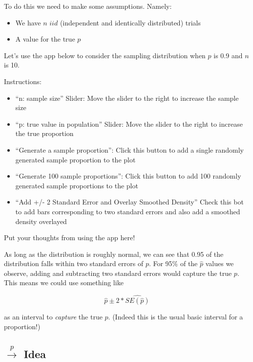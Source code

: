 \documentclass[
]{article}
\providecommand{\tightlist}{%
  \setlength{\itemsep}{0pt}\setlength{\parskip}{0pt}}
\begin{document}
To do this we need to make some assumptions. Namely:

\begin{itemize}
\tightlist
\item
  We have \(n\) \(iid\) (independent and identically distributed) trials
\item
  A value for the true \(p\)
\end{itemize}

Let's use the app below to consider the sampling distribution when \(p\)
is 0.9 and \(n\) is 10.

Instructions:

\begin{itemize}
\tightlist
\item
  ``n: sample size'' Slider: Move the slider to the right to increase
  the sample size
\item
  ``p: true value in population'' Slider: Move the slider to the right
  to increase the true proportion
\item
  ``Generate a sample proportion'': Click this button to add a single
  randomly generated sample proportion to the plot
\item
  ``Generate 100 sample proportions'': Click this button to add 100
  randomly generated sample proportions to the plot
\item
  ``Add +/- 2 Standard Error and Overlay Smoothed Density'' Check this
  bot to add bars corresponding to two standard errors and also add a
  smoothed density overlayed
\end{itemize}

Put your thoughts from using the app here!

As long as the distribution is roughly normal, we can see that 0.95 of
the distribution falls within two standard errors of \(p\). For 95\% of
the \(\hat{p}\) values we observe, adding and subtracting two standard
errors would capture the true \(p\). This means we could use something
like

\[\hat{p}\pm 2*\widehat{SE(\hat{p})}\]

as an interval to \emph{capture} the true \(p\). (Indeed this is the
usual basic interval for a proportion!)

\hypertarget{stackrelprightarrow-idea}{%
\subsection{\texorpdfstring{\(\stackrel{p}{\rightarrow}\)
Idea}{\textbackslash stackrel\{p\}\{\textbackslash rightarrow\} Idea}}\label{stackrelprightarrow-idea}}
\end{document}
